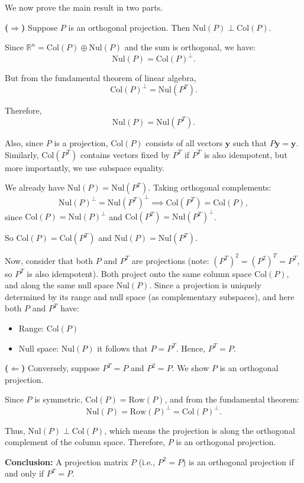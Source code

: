 \documentclass{article}
\begin{document}
We now prove the main result in two parts.

\bigskip

\noindent \textbf{($ \Rightarrow $)} Suppose $ P $ is an orthogonal projection. Then $ \mathrm{Nul}(P) \perp \mathrm{Col}(P) $.

Since $ \mathbb{R}^n = \mathrm{Col}(P) \oplus \mathrm{Nul}(P) $ and the sum is orthogonal, we have:
\[
\mathrm{Nul}(P) = \mathrm{Col}(P)^\perp.
\]

But from the fundamental theorem of linear algebra,
\[
\mathrm{Col}(P)^\perp = \mathrm{Nul}(P^T).
\]

Therefore,
\[
\mathrm{Nul}(P) = \mathrm{Nul}(P^T).
\]

Also, since $ P $ is a projection, $ \mathrm{Col}(P) $ consists of all vectors $ \mathbf{y} $ such that $ P\mathbf{y} = \mathbf{y} $. Similarly, $ \mathrm{Col}(P^T) $ contains vectors fixed by $ P^T $ if $ P^T $ is also idempotent, but more importantly, we use subspace equality.

We already have $ \mathrm{Nul}(P) = \mathrm{Nul}(P^T) $. Taking orthogonal complements:
\[
\mathrm{Nul}(P)^\perp = \mathrm{Nul}(P^T)^\perp \implies \mathrm{Col}(P^T) = \mathrm{Col}(P),
\]
since $ \mathrm{Col}(P) = \mathrm{Nul}(P)^\perp $ and $ \mathrm{Col}(P^T) = \mathrm{Nul}(P^T)^\perp $.

So $ \mathrm{Col}(P) = \mathrm{Col}(P^T) $ and $ \mathrm{Nul}(P) = \mathrm{Nul}(P^T) $.

Now, consider that both $ P $ and $ P^T $ are projections (note: $ (P^T)^2 = (P^2)^T = P^T $, so $ P^T $ is also idempotent). Both project onto the same column space $ \mathrm{Col}(P) $, and along the same null space $ \mathrm{Nul}(P) $. Since a projection is uniquely determined by its range and null space (as complementary subspaces), and here both $ P $ and $ P^T $ have:
\begin{itemize}
\item Range: $ \mathrm{Col}(P) $
    \item Null space: $ \mathrm{Nul}(P) $
it follows that $ P = P^T $.
Hence, $ P^T = P $.
\end{itemize}

\bigskip

\noindent \textbf{($ \Leftarrow $)} Conversely, suppose $ P^T = P $ and $ P^2 = P $. We show $ P $ is an orthogonal projection.

Since $ P $ is symmetric, $ \mathrm{Col}(P) = \mathrm{Row}(P) $, and from the fundamental theorem:
\[
\mathrm{Nul}(P) = \mathrm{Row}(P)^\perp = \mathrm{Col}(P)^\perp.
\]

Thus, $ \mathrm{Nul}(P) \perp \mathrm{Col}(P) $, which means the projection is along the orthogonal complement of the column space. Therefore, $ P $ is an orthogonal projection.

\bigskip

\noindent \textbf{Conclusion:} A projection matrix $ P $ (i.e., $ P^2 = P $) is an orthogonal projection if and only if $ P^T = P $.
\end{document}
